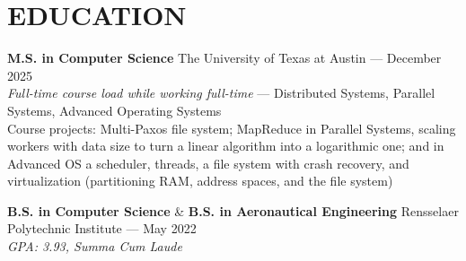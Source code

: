 \documentclass{article}
\begin{document}
\section*{EDUCATION}
\textbf{M.S. in Computer Science} \hfill The University of Texas at Austin — December 2025 \\
\textit{Full-time course load while working full-time} — Distributed Systems, Parallel Systems, Advanced Operating Systems \\
Course projects: Multi-Paxos file system; MapReduce in Parallel Systems, scaling workers with data size to turn a linear algorithm into a logarithmic one; and in Advanced OS a scheduler, threads, a file system with crash recovery, and virtualization (partitioning RAM, address spaces, and the file system)

\textbf{B.S. in Computer Science} \& \textbf{B.S. in Aeronautical Engineering} \hfill Rensselaer Polytechnic Institute — May 2022 \\
\textit{GPA: 3.93, Summa Cum Laude}
\end{document}
